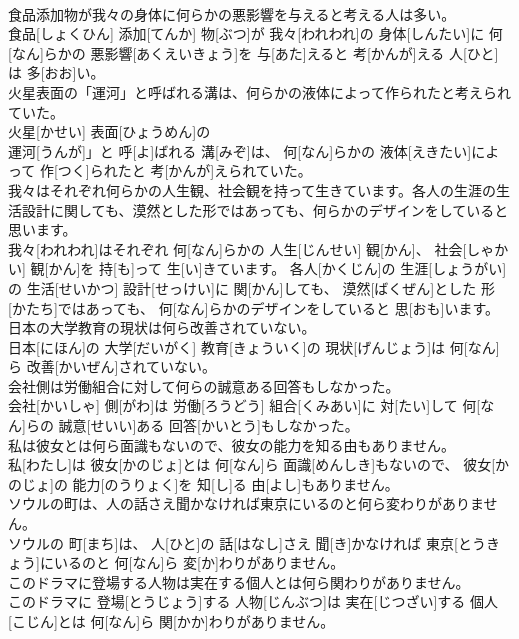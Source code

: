 \documentclass[8pt]{extreport}
\begin{document}
\begin{CJK}{UTF8}{min}
\\	食品添加物が我々の身体に何らかの悪影響を与えると考える人は多い。	
\\	食品[しょくひん] 添加[てんか] 物[ぶつ]が 我々[われわれ]の 身体[しんたい]に 何[なん]らかの 悪影響[あくえいきょう]を 与[あた]えると 考[かんが]える 人[ひと]は 多[おお]い。
\\	火星表面の「運河」と呼ばれる溝は、何らかの液体によって作られたと考えられていた。	
\\	火星[かせい] 表面[ひょうめん]の
\\	運河[うんが]」と 呼[よ]ばれる 溝[みぞ]は、 何[なん]らかの 液体[えきたい]によって 作[つく]られたと 考[かんが]えられていた。
\\	我々はそれぞれ何らかの人生観、社会観を持って生きています。各人の生涯の生活設計に関しても、漠然とした形ではあっても、何らかのデザインをしていると思います。	
\\	我々[われわれ]はそれぞれ 何[なん]らかの 人生[じんせい] 観[かん]、 社会[しゃかい] 観[かん]を 持[も]って 生[い]きています。 各人[かくじん]の 生涯[しょうがい]の 生活[せいかつ] 設計[せっけい]に 関[かん]しても、 漠然[ばくぜん]とした 形[かたち]ではあっても、 何[なん]らかのデザインをしていると 思[おも]います。
\\	日本の大学教育の現状は何ら改善されていない。	
\\	日本[にほん]の 大学[だいがく] 教育[きょういく]の 現状[げんじょう]は 何[なん]ら 改善[かいぜん]されていない。
\\	会社側は労働組合に対して何らの誠意ある回答もしなかった。	
\\	会社[かいしゃ] 側[がわ]は 労働[ろうどう] 組合[くみあい]に 対[たい]して 何[なん]らの 誠意[せいい]ある 回答[かいとう]もしなかった。
\\	私は彼女とは何ら面識もないので、彼女の能力を知る由もありません。	
\\	私[わたし]は 彼女[かのじょ]とは 何[なん]ら 面識[めんしき]もないので、 彼女[かのじょ]の 能力[のうりょく]を 知[し]る 由[よし]もありません。
\\	ソウルの町は、人の話さえ聞かなければ東京にいるのと何ら変わりがありません。	
\\	ソウルの 町[まち]は、 人[ひと]の 話[はなし]さえ 聞[き]かなければ 東京[とうきょう]にいるのと 何[なん]ら 変[か]わりがありません。
\\	このドラマに登場する人物は実在する個人とは何ら関わりがありません。	
\\	このドラマに 登場[とうじょう]する 人物[じんぶつ]は 実在[じつざい]する 個人[こじん]とは 何[なん]ら 関[かか]わりがありません。

\end{CJK}
\end{document}
